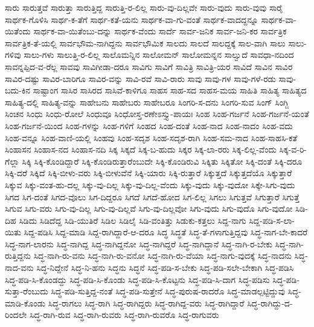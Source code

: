 {ಸಾರು
ಸಾರುತ್ತವೆ
ಸಾರುತ್ತಾ
ಸಾರುತ್ತಿದ್ದ
ಸಾರುತ್ತಿ-ರ-ಲಿಲ್ಲ
ಸಾರು-ವು-ದಿಲ್ಲವೇ
ಸಾರು-ವುದು
ಸಾರು-ವುವು
ಸಾರೈ
ಸಾರ್ಥಕ-ಗೊಳಿಸಿ
ಸಾರ್ಥ-ಕ-ತೆಗೆ
ಸಾರ್ಥ-ಕತೆ-ಯನು
ಸಾರ್ಥಕ-ವಾ-ಗು-ವಂತೆ
ಸಾರ್ಥಕ-ವಾದದ್ದನ್ನೂ
ಸಾರ್ಥಕ-ವಾ-ಯಿತೆಂದು
ಸಾರ್ಥಕ-ವಾ-ಯಿತೆಂಬು-ದನ್ನು
ಸಾರ್ಥಕ-ವೆಂದು
ಸಾರ್ದೆ
ಸಾರ್ವ-ಜನಿಕ
ಸಾರ್ವ-ಜನಿ-ಕರ
ಸಾರ್ವತ್ರಿಕ
ಸಾರ್ವತ್ರಿಕ-ತೆ-ಯಲ್ಲಿ
ಸಾರ್ವಭೌಮ-ನಾಗಿದ್ದನು
ಸಾರ್ವಭೌಮಿಕ
ಸಾಲದು
ಸಾಲದೆ
ಸಾಲದ್ದಕ್ಕೆ
ಸಾಲ-ವಾಗಿ
ಸಾಲು
ಸಾಲು-ಗಳಿವು
ಸಾಲು-ಗಳು
ಸಾಲುತ್ತಿ-ರ-ಲಿಲ್ಲ
ಸಾಲೊಮನ್ನಿನ
ಸಾಲೋಮನ್
ಸಾಲೋಮನ್ನನ
ಸಾಲ್ವುದೆ
ಸಾವಧಾ-ನದಿಂದ
ಸಾವನ್ನಪ್ಪಿದ-ವ-ರೆಲ್ಲ
ಸಾವವು
ಸಾವಿಗೀಡಾ-ದರೂ
ಸಾವಿಗು
ಸಾವಿಗೆ
ಸಾವಿತ್ರಿ
ಸಾವಿತ್ರಿ-ಯರ
ಸಾವಿದೆ
ಸಾವಿನ
ಸಾವಿರ
ಸಾವಿರ-ದಷ್ಟು
ಸಾವಿರ-ಬಾರಿಗೂ
ಸಾವಿರ-ವನ್ನು
ಸಾವಿ-ರವೆ
ಸಾವಿ-ರಾರು
ಸಾವು
ಸಾವು-ಗಳ
ಸಾವು-ಗಳೆ-ರಡು
ಸಾವು-ಬದು-ಕಿನ
ಸಾಷ್ಟಾಂಗ
ಸಾಸಿರ
ಸಾಸಿರದ
ಸಾಸಿವೆ-ಕಾಳಿಗೂ
ಸಾಹಸ
ಸಾಹ-ಸದ
ಸಾಹಸ-ಮಯ
ಸಾಹಿತಿ
ಸಾಹಿತ್ಯ
ಸಾಹಿತ್ಯದ
ಸಾಹಿತ್ಯ-ದಲ್ಲಿ
ಸಾಹಿತ್ಯ-ವನ್ನು
ಸಾಹೇಬನು
ಸಾಹೇಬರು
ಸಾಹೇಬರೂ
ಸಿಂಗರಿ-ಸ-ದನು
ಸಿಂಗರಿ-ಸುವ
ಸಿಂಗ್
ಸಿಂಗ್ಜಿ
ಸಿಂಚನ
ಸಿಂಧು
ಸಿಂಧು-ರೋಲೆ
ಸಿಂಧುವೂ
ಸಿಂಧೋಸ್ತ-ರಣೇಽಸ್ತ್ಯು-ಪಾಯಃ
ಸಿಂಹ
ಸಿಂಹ-ಗರ್ಜನೆ
ಸಿಂಹ-ಗರ್ಜನೆ-ಯಂತೆ
ಸಿಂಹ-ಗರ್ಜನೆ-ಯಿಂದ
ಸಿಂಹ-ಗಳನ್ನು
ಸಿಂಹ-ಗಳಿಗೆ
ಸಿಂಹದ
ಸಿಂಹ-ದಂತೆ
ಸಿಂಹ-ನಾದ
ಸಿಂಹ-ನಾದಂ
ಸಿಂಹ-ವದು
ಸಿಂಹ-ವನ್ನೂ
ಸಿಂಹ-ವಾಣಿ-ಯಲ್ಲಿ
ಸಿಂಹವು
ಸಿಂಹ-ಸದೃಶ
ಸಿಂಹ-ಸದೃಶ-ರಾಗಿ
ಸಿಂಹ-ಸಮ-ನಾದ
ಸಿಂಹ-ಸಾಹಸಿ-ಕತೆ
ಸಿಂಹಾಸನ
ಸಿಂಹಾಸ-ನದ
ಸಿಂಹಾಸ-ನದಿ
ಸಿಕ್ಕ
ಸಿಕ್ಕದೆ
ಸಿಕ್ಕ-ಬ-ಹುದು
ಸಿಕ್ಕರ
ಸಿಕ್ಕ-ಲಾ-ರರು
ಸಿಕ್ಕ-ಲಿಲ್ಲ-ವೆಂದು
ಸಿಕ್ಕ-ವ-ರಿ-ಗೆಲ್ಲಾ
ಸಿಕ್ಕಿ
ಸಿಕ್ಕಿ-ಕೊಂಡಿದ್ದಾರೆ
ಸಿಕ್ಕಿ-ಕೊಂಡಿರುತ್ತಾರೆಂಬುದೇ
ಸಿಕ್ಕಿ-ಕೊಂಡಿರುವಿ
ಸಿಕ್ಕಿತು
ಸಿಕ್ಕಿತೋ
ಸಿಕ್ಕಿ-ದಂತೆ
ಸಿಕ್ಕಿ-ದರೂ
ಸಿಕ್ಕಿ-ದರೆ
ಸಿಕ್ಕಿದೆ
ಸಿಕ್ಕಿ-ಬೀಳು-ವರು
ಸಿಕ್ಕಿ-ಬೀಳುವೆನೆ
ಸಿಕ್ಕಿ-ಯಾರು
ಸಿಕ್ಕಿ-ರುತ್ತಾರೆ
ಸಿಕ್ಕುತ್ತದೆ
ಸಿಕ್ಕುತ್ತದೆಯೊ
ಸಿಕ್ಕುತ್ತಾರೆ
ಸಿಕ್ಕುವ
ಸಿಕ್ಕು-ವಂತ-ಹು-ದಲ್ಲ
ಸಿಕ್ಕು-ವು-ದಿಲ್ಲ
ಸಿಕ್ಕು-ವು-ದಿಲ್ಲ-ವೆಂದು
ಸಿಕ್ಕು-ವುದು
ಸಿಕ್ಕು-ವುದೋ
ಸಿಕ್ಕೇ-ಸಿಗು-ವುದು
ಸಿಗದ
ಸಿಗ-ದಂತೆ
ಸಿಗದ-ವೊಲು
ಸಿಗ-ದಿದ್ದರೂ
ಸಿಗದೆ
ಸಿಗದೆ-ಹೋದ
ಸಿಗ-ಲಿಲ್ಲ
ಸಿಗಲು
ಸಿಗುತ್ತವೆ
ಸಿಗುತ್ತಾರೆ
ಸಿಗುತ್ತೆ
ಸಿಗುವ
ಸಿಗು-ವರು
ಸಿಗು-ವು-ದಿಲ್ಲ
ಸಿಗು-ವು-ದಿಲ್ಲವೆ
ಸಿಗು-ವು-ದಿಲ್ಲವೋ
ಸಿಗು-ವುದು
ಸಿಗು-ವುದೊ
ಸಿಗು-ವುದೋ
ಸಿಡಿ-ದಿಹ
ಸಿಡಿದು
ಸಿಡಿದೆದ್ದ
ಸಿಡಿ-ಯುತಿರೆ
ಸಿಡಿಲ
ಸಿಡಿಲೈ
ಸಿಡಿ-ವಂತಿತ್ತು
ಸಿಡುಕು-ಕತ್ತಲು
ಸಿದ್ದ-ನಾಗು
ಸಿದ್ದ-ಪಡಿ-ಸ-ಲಾ-ಯಿತು
ಸಿದ್ದ-ಪಡಿಸಿ
ಸಿದ್ದ-ಮಾಡಿ
ಸಿದ್ದ-ರಾಗಿದ್ದಾರೆ-ಆ-ದರೂ
ಸಿದ್ಧ
ಸಿದ್ಧತೆ
ಸಿದ್ಧ-ತೆ-ಗಳಾಗುತ್ತಿದ್ದವು
ಸಿದ್ಧ-ನಾಗ-ಬೇ-ಕಾದರೆ
ಸಿದ್ಧ-ನಾಗ-ಲಾರನು
ಸಿದ್ಧ-ನಾಗಿದ್ದ
ಸಿದ್ಧ-ನಾಗಿದ್ದನೋ
ಸಿದ್ಧ-ನಾಗಿದ್ದರೆ
ಸಿದ್ಧ-ನಾಗಿದ್ದಾನೆ
ಸಿದ್ಧ-ನಾಗಿ-ರ-ಬೇಕು
ಸಿದ್ಧ-ನಾಗಿ-ರುತ್ತಿದ್ದನು
ಸಿದ್ಧ-ನಾಗಿ-ರು-ವನು
ಸಿದ್ಧ-ನಾಗಿ-ರು-ವನೋ
ಸಿದ್ಧ-ನಾಗಿ-ರು-ವೆಯಾ
ಸಿದ್ಧ-ನಾಗು-ವುದಕ್ಕೆ
ಸಿದ್ಧ-ನಾದನು
ಸಿದ್ಧ-ನಾದ-ವನು
ಸಿದ್ಧ-ನಿದ್ದೇನೆ
ಸಿದ್ಧ-ನಿ-ಹನು
ಸಿದ್ಧನು
ಸಿದ್ಧನೆ
ಸಿದ್ಧ-ಪಡಿ-ಸ-ಬೇಕು
ಸಿದ್ಧ-ಪಡಿ-ಸಲೇ-ಬೇಕಾಗಿ
ಸಿದ್ಧ-ಪಡಿಸಿ
ಸಿದ್ಧ-ಪಡಿ-ಸಿ-ಕೊಂಡದ್ದು
ಸಿದ್ಧ-ಪಡಿ-ಸಿ-ಕೊಂಡು
ಸಿದ್ಧ-ಪಡಿ-ಸಿ-ಕೊಟ್ಟನು
ಸಿದ್ಧ-ಪಡಿ-ಸಿ-ದಾಗ
ಸಿದ್ಧ-ಪಡಿಸು
ಸಿದ್ಧ-ಪಡಿ-ಸುತ್ತಾ-ರೆಂಬುದು
ಸಿದ್ಧ-ಪಡಿ-ಸುತ್ತಿದ್ದ-ನಂತೆ
ಸಿದ್ಧ-ಪಡಿ-ಸುತ್ತೇನೆ
ಸಿದ್ಧ-ಪುರುಷ-ರಾದರೊ
ಸಿದ್ಧ-ಮಾಡಲ್ಪಟ್ಟಿದ್ದುವು
ಸಿದ್ಧ-ಮಾಡಿ-ಕೊಂಡು
ಸಿದ್ಧ-ರಾಗಲು
ಸಿದ್ಧ-ರಾಗಿ
ಸಿದ್ಧ-ರಾಗಿದ್ದರು
ಸಿದ್ಧ-ರಾಗಿದ್ದ-ವರು
ಸಿದ್ಧ-ರಾಗಿದ್ದಾರೆ
ಸಿದ್ಧ-ರಾಗಿದ್ದು-ದ-ರಿಂದಲೇ
ಸಿದ್ಧ-ರಾಗಿ-ರುವ
ಸಿದ್ಧ-ರಾಗಿ-ರುವರು
ಸಿದ್ಧ-ರಾಗಿ-ರುವರೊ
ಸಿದ್ಧ-ರಾಗುವರು
}
